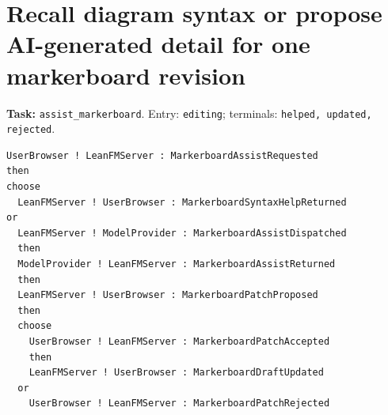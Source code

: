 \section{Recall diagram syntax or propose AI-generated detail for one markerboard revision}
\noindent\textbf{Task:} \texttt{assist\_markerboard}. Entry: \texttt{editing}; terminals: \texttt{helped, updated, rejected}.
\begin{verbatim}
UserBrowser ! LeanFMServer : MarkerboardAssistRequested
then
choose
  LeanFMServer ! UserBrowser : MarkerboardSyntaxHelpReturned
or
  LeanFMServer ! ModelProvider : MarkerboardAssistDispatched
  then
  ModelProvider ! LeanFMServer : MarkerboardAssistReturned
  then
  LeanFMServer ! UserBrowser : MarkerboardPatchProposed
  then
  choose
    UserBrowser ! LeanFMServer : MarkerboardPatchAccepted
    then
    LeanFMServer ! UserBrowser : MarkerboardDraftUpdated
  or
    UserBrowser ! LeanFMServer : MarkerboardPatchRejected
\end{verbatim}
